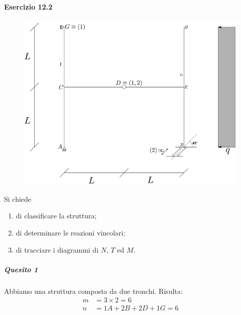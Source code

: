 \paragraph{Esercizio 12.2}
\renewcommand{\thefigure}{12.2~-~1}
\begin{figure}[ht]
\centering
\includegraphics[width=\textwidth]{Immagini/Parte_12/Esercizio12_2/12_2_1.pdf}
\caption{}
\label{Esercizio12-2-1}
\end{figure}
Si chiede 
\begin{enumerate}
\item di classificare la struttura;
\item di determinare le reazioni vincolari;
\item di tracciare i diagrammi di $N$, $T$ ed $M$.
\end{enumerate}
\subparagraph{Quesito 1}
Abbiamo una struttura composta da due tronchi. Risulta:
\begin{align*}
m &= 3\times 2 = 6 \\ 
n &= 1A + 2B + 2D + 1G = 6
\end{align*}
